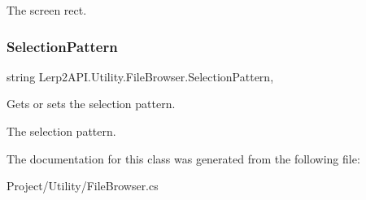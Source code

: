 The screen rect.\mbox{\label{class_lerp2_a_p_i_1_1_utility_1_1_file_browser_a738b0c6ce363d00f70f18e700023822f}} 
\subsubsection{\texorpdfstring{Selection\+Pattern}{SelectionPattern}}
{\footnotesize\ttfamily string Lerp2\+A\+P\+I.\+Utility.\+File\+Browser.\+Selection\+Pattern\hspace{0.3cm}{\ttfamily [get]}, {\ttfamily [set]}}



Gets or sets the selection pattern. 

The selection pattern.

The documentation for this class was generated from the following file\+:\begin{DoxyCompactItemize}
\item 
Project/\+Utility/File\+Browser.\+cs\end{DoxyCompactItemize}
